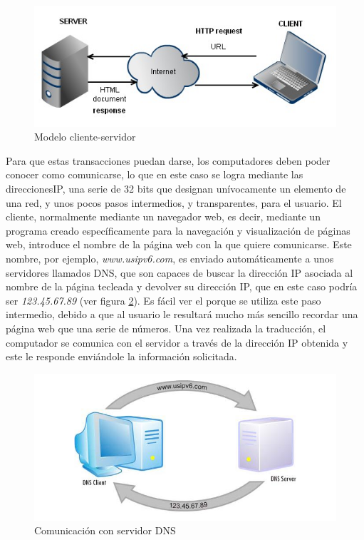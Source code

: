\begin{figure}[h!btp]
\centering
\includegraphics[scale=0.5, fbox={\fboxrule} 4mm]{images/03-antecedentes/10-client_server.png}
\caption{Modelo cliente-servidor}
\label{fig:cliente-servidor}
\end{figure}

Para que estas transacciones puedan darse, los computadores deben poder conocer como comunicarse, lo que en este caso se logra mediante las direcciones\ac{IP}, una serie de 32 bits que designan unívocamente un elemento de una red, y unos pocos pasos intermedios, y transparentes, para el usuario. El cliente, normalmente mediante un navegador web, es decir, mediante un programa creado específicamente para la navegación y visualización de páginas web, introduce el nombre de la página web con la que quiere comunicarse. Este nombre, por ejemplo, \textit{www.usipv6.com}, es enviado automáticamente a unos servidores llamados \ac{DNS}, que son capaces de buscar la dirección \ac{IP} asociada al nombre de la página tecleada y devolver su dirección \ac{IP}, que en este caso podría ser \textit{123.45.67.89} (ver figura \ref{fig:dns-server}). Es fácil ver el porque se utiliza este paso intermedio, debido a que al usuario le resultará mucho más sencillo recordar una página web que una serie de números. Una vez realizada la traducción, el computador se comunica con el servidor a través de la dirección \ac{IP} obtenida y este le responde enviándole la información solicitada.

\begin{figure}[h!btp]
\centering
\includegraphics[scale=0.5, fbox={\fboxrule} 4mm]{images/03-antecedentes/11-dns_server.png}
\caption{Comunicación con servidor DNS}
\label{fig:dns-server}
\end{figure}

